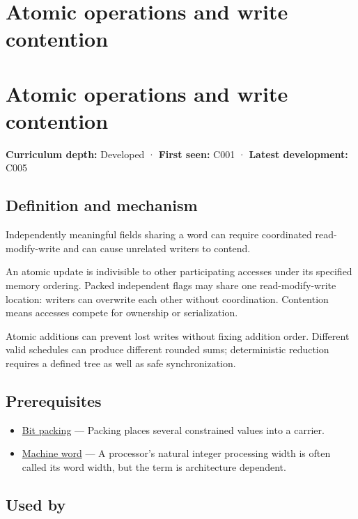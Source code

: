 \hypertarget{appendix-e12d1b03fefb}{}
\section*{Atomic operations and write contention}
\section{Atomic operations and write contention}\label{atomic-operations-and-write-contention}

\textbf{Curriculum depth:} Developed · \textbf{First seen:} C001 · \textbf{Latest development:} C005

\subsection{Definition and mechanism}\label{definition-and-mechanism}

Independently meaningful fields sharing a word can require coordinated read-modify-write and can cause unrelated writers to contend.

An atomic update is indivisible to other participating accesses under its specified memory ordering. Packed independent flags may share one read-modify-write location: writers can overwrite each other without coordination. Contention means accesses compete for ownership or serialization.

Atomic additions can prevent lost writes without fixing addition order. Different valid schedules can produce different rounded sums; deterministic reduction requires a defined tree as well as safe synchronization.

\subsection{Prerequisites}\label{prerequisites}

\begin{itemize}
\tightlist
\item
  \hyperref[appendix-1f9963e1a5d1]{Bit packing} --- Packing places several constrained values into a carrier.
\item
  \hyperref[appendix-d67a19507dc5]{Machine word} --- A processor's natural integer processing width is often called its word width, but the term is architecture dependent.
\end{itemize}

\subsection{Used by}\label{used-by}

